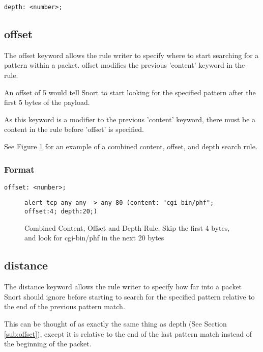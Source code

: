 \documentclass[english]{report}
\begin{document}
\begin{verbatim}
depth: <number>;
\end{verbatim}

\subsection{offset\label{sub:offset}}

The offset keyword allows the rule writer to specify where to start searching
for a pattern within a packet.  offset modifies the previous 'content' keyword
in the rule.

An offset of 5 would tell Snort to start looking for the specified pattern
after the first 5 bytes of the payload.

As this keyword is a modifier to the previous 'content' keyword, there must be
a content in the rule before 'offset' is specified.

See Figure \ref{combined rule with offset and depth} for an example of a
combined content, offset, and depth search rule.

\subsubsection{Format}

\begin{verbatim}
offset: <number>;
\end{verbatim}


\begin{figure}[!hbpt]
\begin{verbatim}
alert tcp any any -> any 80 (content: "cgi-bin/phf"; offset:4; depth:20;)
\end{verbatim}

\caption{\label{combined rule with offset and depth} Combined Content, Offset
and Depth Rule. Skip the first 4 bytes, and look for cgi-bin/phf in the next 20 bytes}
\end{figure}

\subsection{distance\label{sub:Distance}}

The distance keyword allows the rule writer to specify how far into a packet
Snort should ignore before starting to search for the specified pattern
relative to the end of the previous pattern match.  

This can be thought of as exactly the same thing as depth (See Section
\ref{sub:offset}), except it is relative to the end of the last pattern match
instead of the beginning of the packet.
\end{document}
